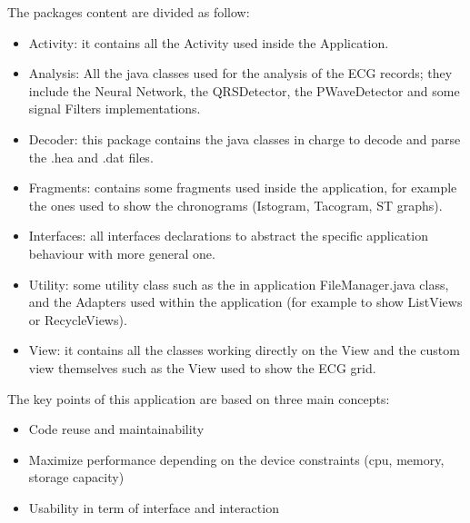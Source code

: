The packages content are divided as follow:
\begin{itemize}
	\item Activity: it contains all the Activity used inside the Application.
    \item Analysis: All the java classes used for the analysis of the ECG records; they include the Neural Network, the QRSDetector, the PWaveDetector and some signal Filters implementations.
	\item Decoder:  this package contains the java classes in charge to decode and parse the .hea and .dat files.
	\item Fragments: contains some fragments used inside the application, for example  the ones used to show the chronograms (Istogram, Tacogram, ST graphs).
	\item Interfaces: all interfaces declarations to abstract the specific application behaviour with more general one.
	\item Utility: some utility class such as the in application FileManager.java class, and the Adapters used within the application (for example to show ListViews or RecycleViews).
	\item View: it contains all the classes working directly on the View and the custom view themselves such as the View used to show the ECG grid.
\end{itemize}
The key points of this application are based on three main concepts:
\begin{itemize}
	\item Code reuse and maintainability
	\item Maximize performance depending on the device constraints (cpu, memory, storage capacity)
	\item Usability in term of interface and interaction
\end{itemize}
